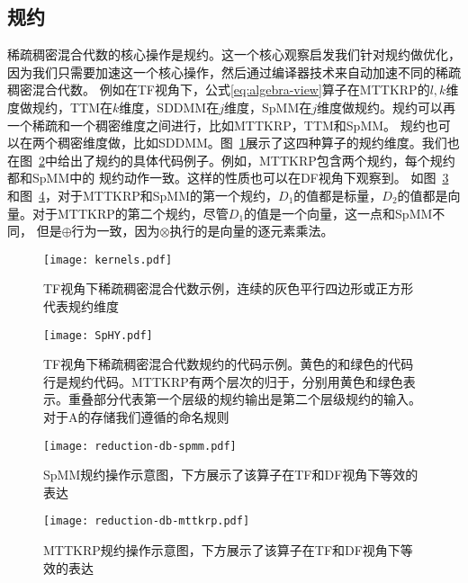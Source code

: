 \subsection{规约}
稀疏稠密混合代数的核心操作是规约。这一个核心观察启发我们针对规约做优化，因为我们只需要加速这一个核心操作，然后通过编译器技术来自动加速不同的稀疏稠密混合代数。
例如在TF视角下，公式\eqref{eq:algebra-view}算子在MTTKRP的$l,k$维度做规约，TTM在$k$维度，SDDMM在$j$维度，SpMM在$j$维度做规约。规约可以再一个稀疏和一个稠密维度之间进行，比如MTTKRP，TTM和SpMM。
规约也可以在两个稠密维度做，比如SDDMM。图~\ref{fig:kernels}展示了这四种算子的规约维度。我们也在图~\ref{fig:four-code}中给出了规约的具体代码例子。例如，MTTKRP包含两个规约，每个规约都和SpMM中的
规约动作一致。这样的性质也可以在DF视角下观察到。 如图~\ref{fig:redb-spmm}和图~\ref{fig:redb-mttkrp}，对于MTTKRP和SpMM的第一个规约，$D_1$的值都是标量，$D_2$的值都是向量。对于MTTKRP的第二个规约，尽管$D_1$的值是一个向量，这一点和SpMM不同，
但是$\oplus$行为一致，因为$\otimes$执行的是向量的逐元素乘法。
\begin{figure}[h]%
  \centering
  \texttt{[image: kernels.pdf]}
  \caption{TF视角下稀疏稠密混合代数示例，连续的灰色平行四边形或正方形代表规约维度}
  \label{fig:kernels}
\end{figure}
\begin{figure}[h]%
  \centering
  \texttt{[image: SpHY.pdf]}
  \caption{TF视角下稀疏稠密混合代数规约的代码示例。黄色的和绿色的代码行是规约代码。MTTKRP有两个层次的归于，分别用黄色和绿色表示。重叠部分代表第一个层级的规约输出是第二个层级规约的输入。对于A的存储我们遵循\cite{kjolstad:2020:phd-thesis}的命名规则}
  \label{fig:four-code}
\end{figure}
\begin{figure}[h]%
  \centering
  \texttt{[image: reduction-db-spmm.pdf]}
  \caption{SpMM规约操作示意图，下方展示了该算子在TF和DF视角下等效的表达}
  \label{fig:redb-spmm}
\end{figure}
\begin{figure}[h]%
  \centering
  \texttt{[image: reduction-db-mttkrp.pdf]}
  \caption{MTTKRP规约操作示意图，下方展示了该算子在TF和DF视角下等效的表达}
  \label{fig:redb-mttkrp}
\end{figure}

